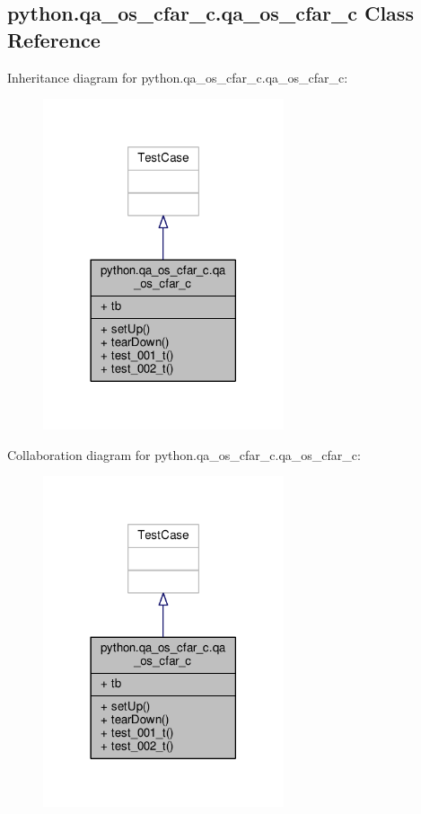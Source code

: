 \subsection{python.\+qa\+\_\+os\+\_\+cfar\+\_\+c.\+qa\+\_\+os\+\_\+cfar\+\_\+c Class Reference}
\label{classpython_1_1qa__os__cfar__c_1_1qa__os__cfar__c}


Inheritance diagram for python.\+qa\+\_\+os\+\_\+cfar\+\_\+c.\+qa\+\_\+os\+\_\+cfar\+\_\+c\+:
\nopagebreak
\begin{figure}[H]
\begin{center}
\leavevmode
\includegraphics[width=201pt]{d8/d5b/classpython_1_1qa__os__cfar__c_1_1qa__os__cfar__c__inherit__graph}
\end{center}
\end{figure}


Collaboration diagram for python.\+qa\+\_\+os\+\_\+cfar\+\_\+c.\+qa\+\_\+os\+\_\+cfar\+\_\+c\+:
\nopagebreak
\begin{figure}[H]
\begin{center}
\leavevmode
\includegraphics[width=201pt]{d2/dec/classpython_1_1qa__os__cfar__c_1_1qa__os__cfar__c__coll__graph}
\end{center}
\end{figure}
